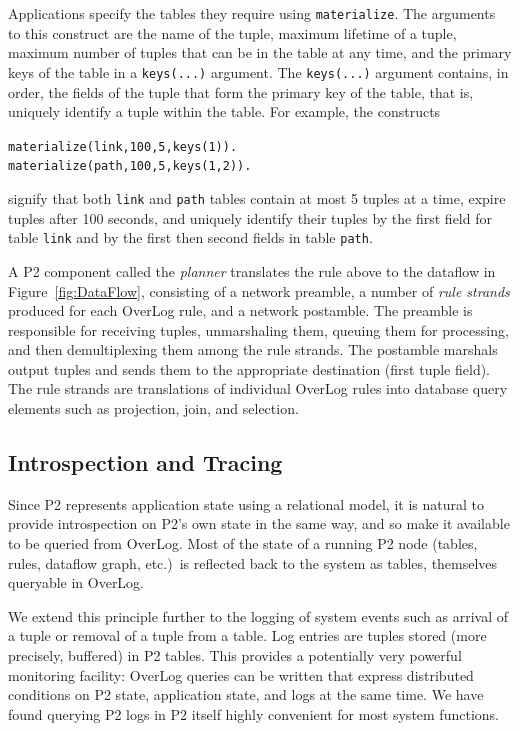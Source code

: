 \documentclass{sig-alt-full}
\def\Sys{P2\xspace}
\def\Lang{OverLog\xspace}
\newenvironment{overlog}{\begin{alltt}\footnotesize}{\end{alltt}}
\newcommand{\ol}[1]{{\tt\footnotesize#1}}
\begin{document}
Applications specify the tables they require using \ol{materialize}. The
arguments to this construct are the name of the tuple, 
maximum lifetime of a tuple, maximum number of tuples that can be in the table
at any time, and the primary keys of the table in a \ol{keys(...)} argument. The \ol{keys(...)} argument 
contains, in order, the fields of the 
tuple that form the primary key of the table, that is, uniquely identify
a tuple within the table.  For example, the constructs
\begin{overlog}
materialize(link, 100, 5, keys(1)).
materialize(path, 100, 5, keys(1,2)).
\end{overlog}
signify that both \texttt{link} and \texttt{path} tables 
contain at most 5 tuples at a time, expire tuples after 100 seconds, and
uniquely identify their tuples by the first field for table
\texttt{link} and by the first then second fields in table \texttt{path}.


A \Sys component called the \emph{planner} translates the rule above to 
the dataflow in Figure~\ref{fig:DataFlow}, consisting of a network
preamble, a number of \emph{rule 
strands} produced for each \Lang rule, and a network postamble.  The
preamble is responsible for receiving tuples, unmarshaling them,
queuing them for processing, and then demultiplexing them among the
rule strands. The postamble marshals output tuples and 
sends them to the appropriate destination (first tuple
field). The rule strands are translations of individual \Lang rules
into database query elements such as projection, join, and selection.

\subsection{Introspection and Tracing}

Since \Sys represents application state using a relational model, it
is natural  to provide introspection on \Sys's own
state in the same way, and so make it available to be queried from
\Lang.  Most of the state of a running \Sys
node (tables, rules, dataflow graph, etc.)\ is reflected back to the
system as tables, themselves queryable in \Lang.


We extend this principle further to the logging of system
events such as arrival of a tuple or removal of a tuple from a table.  
Log entries are tuples stored (more
precisely, buffered) in \Sys tables.   This
provides a potentially very powerful monitoring facility: \Lang
queries can be written that express distributed conditions on 
\Sys state, application state, and logs at the same time.   
We have found querying \Sys logs in
\Sys itself highly convenient for most system
functions. 
\end{document}
